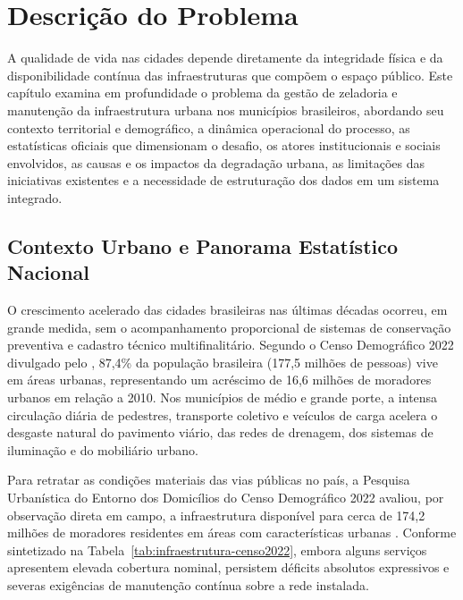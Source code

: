 \chapter{Descrição do Problema}
\label{cap:problema}

A qualidade de vida nas cidades depende diretamente da integridade física e da disponibilidade contínua das infraestruturas que compõem o espaço público. Este capítulo examina em profundidade o problema da gestão de zeladoria e manutenção da infraestrutura urbana nos municípios brasileiros, abordando seu contexto territorial e demográfico, a dinâmica operacional do processo, as estatísticas oficiais que dimensionam o desafio, os atores institucionais e sociais envolvidos, as causas e os impactos da degradação urbana, as limitações das iniciativas existentes e a necessidade de estruturação dos dados em um sistema integrado.

\section{Contexto Urbano e Panorama Estatístico Nacional}
\label{sec:contexto-estatisticas}

O crescimento acelerado das cidades brasileiras nas últimas décadas ocorreu, em grande medida, sem o acompanhamento proporcional de sistemas de conservação preventiva e cadastro técnico multifinalitário. Segundo o Censo Demográfico 2022 divulgado pelo , 87,4\% da população brasileira (177,5 milhões de pessoas) vive em áreas urbanas, representando um acréscimo de 16,6 milhões de moradores urbanos em relação a 2010. Nos municípios de médio e grande porte, a intensa circulação diária de pedestres, transporte coletivo e veículos de carga acelera o desgaste natural do pavimento viário, das redes de drenagem, dos sistemas de iluminação e do mobiliário urbano.

Para retratar as condições materiais das vias públicas no país, a Pesquisa Urbanística do Entorno dos Domicílios do Censo Demográfico 2022 avaliou, por observação direta em campo, a infraestrutura disponível para cerca de 174,2 milhões de moradores residentes em áreas com características urbanas \cite{ibge2025entorno}. Conforme sintetizado na Tabela~\ref{tab:infraestrutura-censo2022}, embora alguns serviços apresentem elevada cobertura nominal, persistem déficits absolutos expressivos e severas exigências de manutenção contínua sobre a rede instalada.

